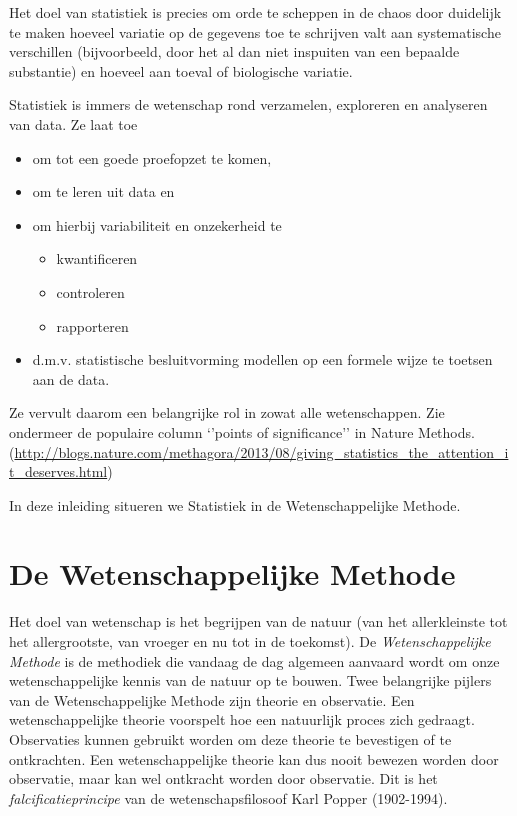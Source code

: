 \documentclass[
  12pt,dutch,coursenotes]{book}
\providecommand{\tightlist}{%
  \setlength{\itemsep}{0pt}\setlength{\parskip}{0pt}}
\begin{document}
Het doel van statistiek is precies om orde te scheppen in de chaos door duidelijk te maken hoeveel variatie op de gegevens toe te schrijven valt aan systematische verschillen (bijvoorbeeld, door het al dan niet inspuiten van een bepaalde substantie) en hoeveel aan toeval of biologische variatie.

Statistiek is immers de wetenschap rond verzamelen, exploreren en analyseren van data. Ze laat toe

\begin{itemize}
\tightlist
\item
  om tot een goede proefopzet te komen,
\item
  om te leren uit data en
\item
  om hierbij variabiliteit en onzekerheid te

  \begin{itemize}
  \tightlist
  \item
    kwantificeren
  \item
    controleren
  \item
    rapporteren
  \end{itemize}
\item
  d.m.v. statistische besluitvorming modellen op een formele wijze te toetsen aan de data.
\end{itemize}

Ze vervult daarom een belangrijke rol in zowat alle wetenschappen. Zie ondermeer de populaire column `'points of significance'' in Nature Methods. (\url{http://blogs.nature.com/methagora/2013/08/giving_statistics_the_attention_it_deserves.html})

In deze inleiding situeren we Statistiek in de Wetenschappelijke Methode.

\hypertarget{sec:wetMeth}{%
\section{De Wetenschappelijke Methode}\label{sec:wetMeth}}

Het doel van wetenschap is het begrijpen van de natuur (van het allerkleinste tot het allergrootste, van vroeger en nu tot in de toekomst). De \emph{Wetenschappelijke Methode} is de methodiek die vandaag de dag algemeen aanvaard wordt om onze wetenschappelijke kennis van de natuur op te bouwen. Twee belangrijke pijlers van de Wetenschappelijke Methode zijn theorie en observatie. Een wetenschappelijke theorie voorspelt hoe een natuurlijk proces zich gedraagt. Observaties kunnen gebruikt worden om deze theorie te bevestigen of te ontkrachten. Een wetenschappelijke theorie kan dus nooit bewezen worden door observatie, maar kan wel ontkracht worden door observatie. Dit is het \emph{falcificatieprincipe} van de wetenschapsfilosoof Karl Popper (1902-1994).
\end{document}
